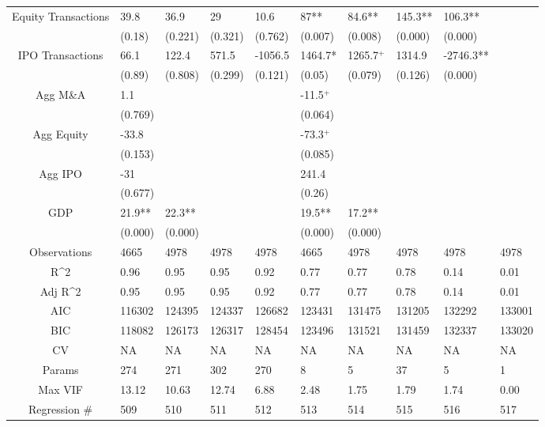 \documentclass{article}
\begin{document}
\begin{table}[H]
\begin{tabular}{|clllllllll|}
  Equity Transactions & 39.8 & 36.9 & 29 & 10.6 & 87** & 84.6** & 145.3** & 106.3** &  \\ 
   & (0.18) & (0.221) & (0.321) & (0.762) & (0.007) & (0.008) & (0.000) & (0.000) &  \\ 
  IPO Transactions & 66.1 & 122.4 & 571.5 & -1056.5 & 1464.7* & 1265.7$^{+}$ & 1314.9 & -2746.3** &  \\ 
   & (0.89) & (0.808) & (0.299) & (0.121) & (0.05) & (0.079) & (0.126) & (0.000) &  \\ 
  Agg M\&A & 1.1 &  &  &  & -11.5$^{+}$ &  &  &  &  \\ 
   & (0.769) &  &  &  & (0.064) &  &  &  &  \\ 
  Agg Equity & -33.8 &  &  &  & -73.3$^{+}$ &  &  &  &  \\ 
   & (0.153) &  &  &  & (0.085) &  &  &  &  \\ 
  Agg IPO & -31 &  &  &  & 241.4 &  &  &  &  \\ 
   & (0.677) &  &  &  & (0.26) &  &  &  &  \\ 
  GDP & 21.9** & 22.3** &  &  & 19.5** & 17.2** &  &  &  \\ 
   & (0.000) & (0.000) &  &  & (0.000) & (0.000) &  &  &  \\ 
  \hline 
 Observations & 4665 & 4978 & 4978 & 4978 & 4665 & 4978 & 4978 & 4978 & 4978 \\ 
  R^2 & 0.96 & 0.95 & 0.95 & 0.92 & 0.77 & 0.77 & 0.78 & 0.14 & 0.01 \\ 
  Adj R^2 & 0.95 & 0.95 & 0.95 & 0.92 & 0.77 & 0.77 & 0.78 & 0.14 & 0.01 \\ 
  AIC & 116302 & 124395 & 124337 & 126682 & 123431 & 131475 & 131205 & 132292 & 133001 \\ 
  BIC & 118082 & 126173 & 126317 & 128454 & 123496 & 131521 & 131459 & 132337 & 133020 \\ 
  CV & NA & NA & NA & NA & NA & NA & NA & NA & NA \\ 
  Params & 274 & 271 & 302 & 270 & 8 & 5 & 37 & 5 & 1 \\ 
  Max VIF & 13.12 & 10.63 & 12.74 & 6.88 & 2.48 & 1.75 & 1.79 & 1.74 & 0.00 \\ 
  Regression \# & 509 & 510 & 511 & 512 & 513 & 514 & 515 & 516 & 517 \\ 
   \hline
\end{tabular}
 
\end{table}
\end{document}
